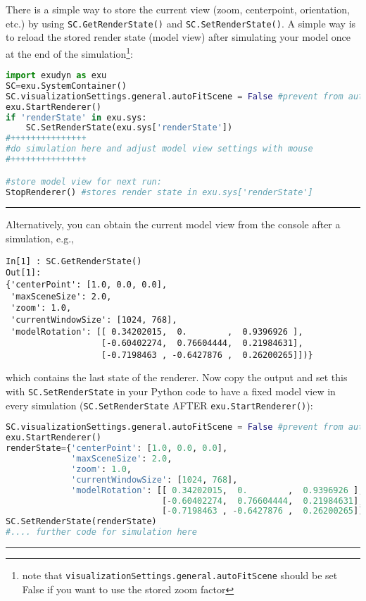 \label{sec:storing:modelview}
There is a simple way to store the current view (zoom, centerpoint, orientation, etc.) by using \texttt{SC.GetRenderState()} and \texttt{SC.SetRenderState()}.
%
A simple way is to reload the stored render state (model view) after simulating your model once at the end of the simulation\footnote{
note that \texttt{visualizationSettings.general.autoFitScene} should be set False if you want to use the stored zoom factor}:
\pythonstyle
\begin{lstlisting}[language=Python, firstnumber=1]
import exudyn as exu
SC=exu.SystemContainer()
SC.visualizationSettings.general.autoFitScene = False #prevent from autozoom
exu.StartRenderer()
if 'renderState' in exu.sys:
    SC.SetRenderState(exu.sys['renderState']) 
#+++++++++++++++
#do simulation here and adjust model view settings with mouse
#+++++++++++++++

#store model view for next run:
StopRenderer() #stores render state in exu.sys['renderState']
\end{lstlisting}
\par\noindent\rule{\textwidth}{0.4pt}
%
Alternatively, you can obtain the current model view from the console after a simulation, e.g.,
\pythonstyle
\begin{lstlisting}
In[1] : SC.GetRenderState()
Out[1]: 
{'centerPoint': [1.0, 0.0, 0.0],
 'maxSceneSize': 2.0,
 'zoom': 1.0,
 'currentWindowSize': [1024, 768],
 'modelRotation': [[ 0.34202015,  0.        ,  0.9396926 ],
                   [-0.60402274,  0.76604444,  0.21984631],
                   [-0.7198463 , -0.6427876 ,  0.26200265]])}
\end{lstlisting}
%
which contains the last state of the renderer.
Now copy the output and set this with \texttt{SC.SetRenderState} in your Python code to have a fixed model view in every simulation (\texttt{SC.SetRenderState} AFTER \texttt{exu.StartRenderer()}):
\pythonstyle
\begin{lstlisting}[language=Python, firstnumber=1]
SC.visualizationSettings.general.autoFitScene = False #prevent from autozoom
exu.StartRenderer()
renderState={'centerPoint': [1.0, 0.0, 0.0],
             'maxSceneSize': 2.0,
             'zoom': 1.0,
             'currentWindowSize': [1024, 768],
             'modelRotation': [[ 0.34202015,  0.        ,  0.9396926 ],
                               [-0.60402274,  0.76604444,  0.21984631],
                               [-0.7198463 , -0.6427876 ,  0.26200265]])
SC.SetRenderState(renderState)
#.... further code for simulation here
\end{lstlisting}
\par\noindent\rule{\textwidth}{0.4pt}
%
%

